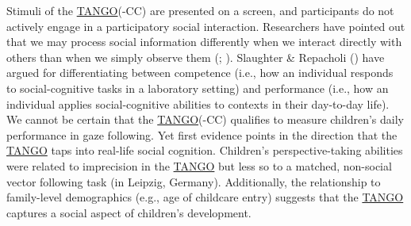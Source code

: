 \documentclass[
]{scrbook}
\begin{document}
Stimuli of the \hyperref[acronyms_TANGO]{TANGO}(-CC) are presented on a screen, and participants do not actively engage in a participatory social interaction. Researchers have pointed out that we may process social information differently when we interact directly with others than when we simply observe them (; ). Slaughter \& Repacholi () have argued for differentiating between competence (i.e., how an individual responds to social-cognitive tasks in a laboratory setting) and performance (i.e., how an individual applies social-cognitive abilities to contexts in their day-to-day life). We cannot be certain that the \hyperref[acronyms_TANGO]{TANGO}(-CC) qualifies to measure children's daily performance in gaze following. Yet first evidence points in the direction that the \hyperref[acronyms_TANGO]{TANGO} taps into real-life social cognition. Children's perspective-taking abilities were related to imprecision in the \hyperref[acronyms_TANGO]{TANGO} but less so to a matched, non-social vector following task (in Leipzig, Germany). Additionally, the relationship to family-level demographics (e.g., age of childcare entry) suggests that the \hyperref[acronyms_TANGO]{TANGO} captures a social aspect of children's development.
\end{document}
